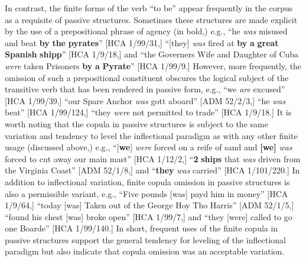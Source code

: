 In contrast, the finite forms of the verb “to be” appear frequently in the corpus as a requisite of passive structures. Sometimes these structures are made explicit by the use of a prepositional phrase of agency (in bold,) e.g., “he \textit{was} misused and beat \textbf{by} \textbf{the} \textbf{pyrates}” [HCA 1/99/31,] “[they] \textit{was}\textbf{ }fired at \textbf{by} \textbf{a} \textbf{great} \textbf{Spanish} \textbf{shipp}” [HCA 1/9/18,] and “the Governers Wife and Daughter of Cuba \textit{were} taken Prisoners \textbf{by} \textbf{a} \textbf{Pyrate}” [HCA 1/99/9.] However, more frequently, the omission of such a prepositional constituent obscures the logical subject of the transitive verb that has been rendered in passive form, e.g., “we \textit{are} excused” [HCA 1/99/39,] “our Spare Anchor \textit{was} gott aboard” [ADM 52/2/3,] “he \textit{was} beat” [HCA 1/99/124,] “they \textit{were} not permitted to trade” [HCA 1/9/18.] It is worth noting that the copula in passive structures is subject to the same variation and tendency to level the inflectional paradigm as with any other finite usage (discussed above,) e.g., “[\textbf{we}] \textit{were} forced on a reife of sand and \textbf{[we]} \textit{was} forced to cut away our main mast” [HCA 1/12/2,] “\textbf{2} \textbf{ships} that \textit{was} driven from the Virginia Coast” [ADM 52/1/8,] and “\textbf{they} \textit{was} carried” [HCA 1/101/220.] In addition to inflectional variation, finite copula omission in passive structures is also a permissible variant, e.g., “Five pounds [was] payd him in money” [HCA 1/9/64,] “today [was] Taken out of the George Hoy Tho Harris” [ADM 52/1/5,] “found his chest [was] broke open” [HCA 1/99/7,] and “they [were] called to go one Boarde” [HCA 1/99/140.] In short, frequent uses of the finite copula in passive structures support the general tendency for leveling of the inflectional paradigm but also indicate that copula omission was an acceptable variation. 


